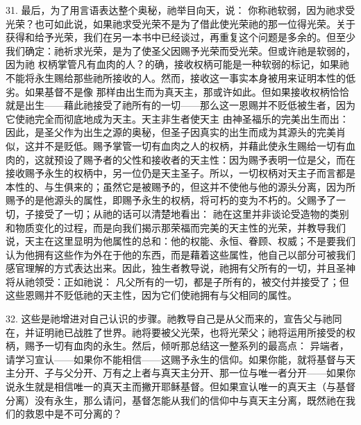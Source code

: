 31. 最后，为了用言语表达整个奥秘，祂举目向天，说： 你称祂软弱，因为祂求受光荣？也可如此说，如果祂求受光荣不是为了借此使光荣祂的那一位得光荣。关于获得和给予光荣，我们在另一本书中已经谈过，再重复这个问题是多余的。但至少我们确定：祂祈求光荣，是为了使圣父因赐予光荣而受光荣。但或许祂是软弱的，因为祂  权柄掌管凡有血肉的人？的确，接收权柄可能是一种软弱的标记，如果祂不能将永生赐给那些祂所接收的人。然而，接收这一事实本身被用来证明本性的低劣。如果基督不是像  那样由出生而为真天主，那或许如此。但如果接收权柄恰恰就是出生——藉此祂接受了祂所有的一切——那么这一恩赐并不贬低被生者，因为它使祂完全而彻底地成为天主。天主非生者使天主  由神圣福乐的完美出生而出：因此，是圣父作为出生之源的奥秘，但圣子因真实的出生而成为其源头的完美肖似，这并不是贬低。赐予掌管一切有血肉之人的权柄，并藉此使永生赐给一切有血肉的，这就预设了赐予者的父性和接收者的天主性：因为赐予表明一位是父，而在接收赐予永生的权柄中，另一位仍是天主圣子。所以，一切权柄对天主子而言都是本性的、与生俱来的；虽然它是被赐予的，但这并不使他与他的源头分离，因为所赐予的是他源头的属性，即赐予永生的权柄，将可朽的变为不朽的。父赐予了一切，子接受了一切；从祂的话可以清楚地看出： 祂在这里并非谈论受造物的类别和物质变化的过程，而是向我们揭示那荣福而完美的天主性的光荣，并教导我们说，天主在这里显明为他属性的总和：他的权能、永恒、眷顾、权威；不是要我们认为他拥有这些作为外在于他的东西，而是藉着这些属性，他自己以部分可被我们感官理解的方式表达出来。因此，独生者教导说，祂拥有父所有的一切，并且圣神将从祂领受：正如祂说： 凡父所有的一切，都是子所有的，被交付并接受了；但这些恩赐并不贬低祂的天主性，因为它们使祂拥有与父相同的属性。\par

32. 这些是祂增进对自己认识的步骤。祂教导自己是从父而来的，宣告父与祂同在，并证明祂已战胜了世界。祂将要被父光荣，也将光荣父；祂将运用所接受的权柄，赐予一切有血肉的永生。然后，倾听那总结这一整系列的最高点： 异端者，请学习宣认——如果你不能相信——这赐予永生的信仰。如果你能，就将基督与天主分开、子与父分开、万有之上者与真天主分开、那一位与唯一者分开——如果你说永生就是相信唯一的真天主而撇开耶稣基督。但如果宣认唯一的真天主（与基督分离）没有永生，那么请问，基督怎能从我们的信仰中与真天主分离，既然祂在我们的救恩中是不可分离的？\par

